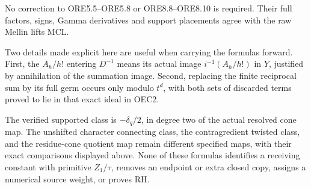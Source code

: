 No correction to ORE5.5--ORE5.8 or ORE8.8--ORE8.10 is required. Their
full factors, signs, Gamma derivatives and support placements agree with
the raw Mellin lifts MCL.

Two details made explicit here are useful when carrying the formulas
forward. First, the \(A_h/h!\) entering \(D^{-1}\) means its actual
image \(i^{-1}(A_h/h!)\) in \(Y\), justified by annihilation of the
summation image. Second, replacing the finite reciprocal sum by its full
germ occurs only modulo \(t^d\), with both sets of discarded terms
proved to lie in that exact ideal in OEC2.

The verified supported class is \(-\delta_q/2\), in degree two of the
actual resolved cone map. The unshifted character connecting class, the
contragredient twisted class, and the residue-cone quotient map remain
different specified maps, with their exact comparisons displayed above.
None of these formulas identifies a receiving constant with primitive
\(Z_1/\tau\), removes an endpoint or extra closed copy, assigns a
numerical source weight, or proves RH.
